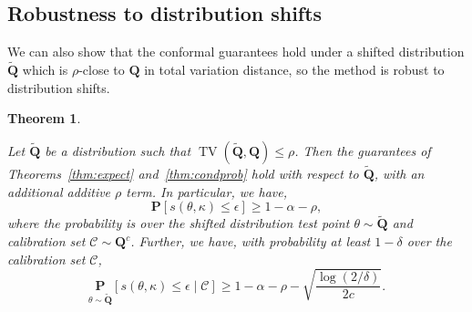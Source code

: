 \documentclass[12pt]{article}
\newtheorem{theorem}{Theorem}[section]     %
\theoremstyle{definition}
\theoremstyle{remark}
\newcommand{\paramdist}{\mathbf{Q}}
\newcommand{\param}{\theta}
\newcommand{\Prob}{\mathbf{P}}
\newcommand{\tol}{\epsilon}
\newcommand{\calibration}{\mathcal{C}}
\newcommand{\termov}{s}
\newcommand{\lt}{\kappa}
\newcommand{\ncalib}{c}
\newcommand{\change}[1]{#1}
\newcommand{\paramdist}{\mathbf{Q}}
\newcommand{\param}{\theta}
\newcommand{\Prob}{\mathbf{P}}
\newcommand{\tol}{\epsilon}
\newcommand{\calibration}{\mathcal{C}}
\newcommand{\termov}{s}
\newcommand{\lt}{\kappa}
\newcommand{\ncalib}{c}
\newcommand{\change}[1]{#1}
\theoremstyle{plain}
\newtheorem{theorem}{Theorem}[section]
\theoremstyle{definition}
\theoremstyle{remark}
\begin{document}
\subsection{Robustness to distribution shifts}
\change{
    We can also show that the conformal guarantees hold under a shifted distribution $\tilde{\paramdist}$ which is $\rho$-close to $\paramdist$ in total variation distance, so the method is robust to distribution shifts.
}
\begin{theorem} \label{thm:distshift}
    \change{
        Let $\tilde{\paramdist}$ be a distribution such that $\operatorname{TV}(\tilde{\paramdist}, \paramdist) \le \rho$.
        Then the guarantees of Theorems~\ref{thm:expect} and~\ref{thm:condprob} hold with respect to $\tilde{\paramdist}$, with an additional additive $\rho$ term.
        In particular, we have,
        \begin{equation*}
            \Prob[\termov(\param, \lt) \le \tol] \ge 1 - \alpha - \rho,
        \end{equation*}
        where the probability is over the shifted distribution test point $\param \sim \tilde{\paramdist}$ and calibration set $\calibration \sim \paramdist^\ncalib$.
        Further, we have, with probability at least $1 - \delta$ over the calibration set $\calibration$,
        \begin{equation*}
            \underset{\param \sim \tilde{\paramdist}}{\Prob}[\termov(\param, \lt) \le \tol \mid \calibration] \ge 1 - \alpha - \rho - \sqrt{\frac{\log(2/\delta)}{2\ncalib}}.
        \end{equation*}
    }
\end{theorem}
\proof
\end{document}

